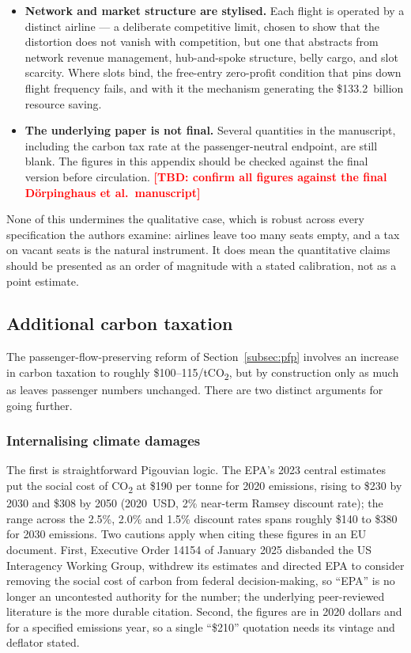 \documentclass[11pt]{article}
\newcommand{\tbd}[1]{\textcolor{red}{\textbf{[TBD: #1]}}}
\begin{document}
\begin{itemize}
  \item \textbf{Network and market structure are stylised.} Each flight is
  operated by a distinct airline --- a deliberate competitive limit, chosen to
  show that the distortion does not vanish with competition, but one that
  abstracts from network revenue management, hub-and-spoke structure, belly
  cargo, and slot scarcity. Where slots bind, the free-entry zero-profit
  condition that pins down flight frequency fails, and with it the mechanism
  generating the \$133.2~billion resource saving.

  \item \textbf{The underlying paper is not final.} Several quantities in the
  manuscript, including the carbon tax rate at the passenger-neutral endpoint,
  are still blank. The figures in this appendix should be checked against the
  final version before circulation.
  \tbd{confirm all figures against the final Dörpinghaus et al.\ manuscript}
\end{itemize}

None of this undermines the qualitative case, which is robust across every
specification the authors examine: airlines leave too many seats empty, and a
tax on vacant seats is the natural instrument. It does mean the quantitative
claims should be presented as an order of magnitude with a stated calibration,
not as a point estimate.

\subsection{Additional carbon taxation}
\label{subsec:more-carbon}

The passenger-flow-preserving reform of Section~\ref{subsec:pfp} involves an
increase in carbon taxation to roughly \$100--115/tCO\textsubscript{2}, but by
construction only as much as leaves passenger numbers unchanged. There are two
distinct arguments for going further.

\subsubsection{Internalising climate damages}

The first is straightforward Pigouvian logic. The EPA's 2023 central estimates
put the social cost of CO\textsubscript{2} at \$190 per tonne for 2020
emissions, rising to \$230 by 2030 and \$308 by 2050 (2020~USD, 2\% near-term
Ramsey discount rate); the range across the 2.5\%, 2.0\% and 1.5\% discount
rates spans roughly \$140 to \$380 for 2030 emissions. Two cautions apply when
citing these figures in an EU document. First, Executive Order 14154 of
January 2025 disbanded the US Interagency Working Group, withdrew its estimates
and directed EPA to consider removing the social cost of carbon from federal
decision-making, so ``EPA'' is no longer an uncontested authority for the
number; the underlying peer-reviewed literature is the more durable citation.
Second, the figures are in 2020 dollars and for a specified emissions year, so a
single ``\$210'' quotation needs its vintage and deflator stated.
\end{document}
